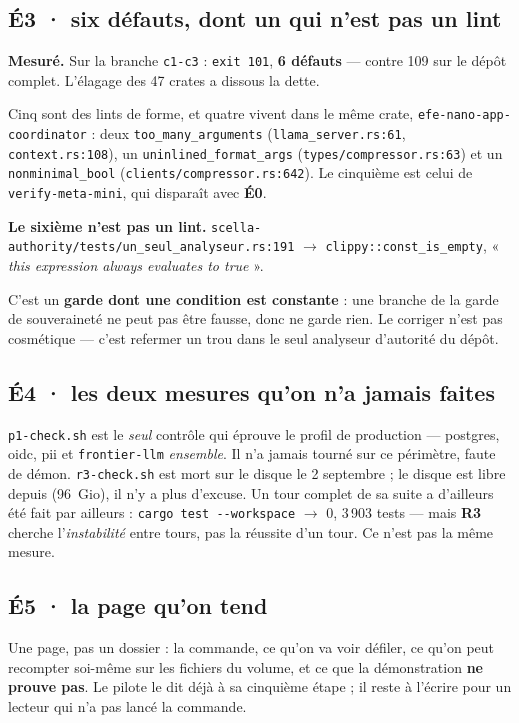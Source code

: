 \documentclass[11pt]{article}
\newcommand{\code}[1]{\texttt{\small #1}}
\newcommand{\mm}[1]{\textbf{#1}}
\newcommand{\mesure}[1]{{\color{efeteal}\textbf{Mesuré.} }#1\par}
\newcommand{\fl}{$\rightarrow$}
\begin{document}
\subsection{\mm{É3} · six défauts, dont un qui n'est pas un lint}
\mesure{Sur la branche \code{c1-c3} : \code{exit 101}, \textbf{6 défauts} --- contre 109 sur le
dépôt complet. L'élagage des 47 crates a dissous la dette.}

Cinq sont des lints de forme, et quatre vivent dans le même crate,
\code{efe-nano-app-coordinator} : deux \code{too\_many\_arguments}
(\code{llama\_server.rs:61}, \code{context.rs:108}), un \code{uninlined\_format\_args}
(\code{types/compressor.rs:63}) et un \code{nonminimal\_bool}
(\code{clients/compressor.rs:642}). Le cinquième est celui de \code{verify-meta-mini}, qui
disparaît avec \mm{É0}.

\begin{cadre}
\textbf{Le sixième n'est pas un lint.}
\code{scella-authority/tests/un\_seul\_analyseur.rs:191} \fl{} \code{clippy::const\_is\_empty},
« \emph{this expression always evaluates to true} ».

C'est un \textbf{garde dont une condition est constante} : une branche de la garde de souveraineté
ne peut pas être fausse, donc ne garde rien. Le corriger n'est pas cosmétique --- c'est refermer
un trou dans le seul analyseur d'autorité du dépôt.
\end{cadre}

\subsection{\mm{É4} · les deux mesures qu'on n'a jamais faites}
\code{p1-check.sh} est le \emph{seul} contrôle qui éprouve le profil de production --- postgres,
oidc, pii et \code{frontier-llm} \emph{ensemble}. Il n'a jamais tourné sur ce périmètre, faute de
démon. \code{r3-check.sh} est mort sur le disque le 2 septembre ; le disque est libre depuis (96~Gio),
il n'y a plus d'excuse. Un tour complet de sa suite a d'ailleurs été fait par ailleurs :
\code{cargo test -{}-workspace} \fl{} 0, 3\,903 tests --- mais \mm{R3} cherche l'\emph{instabilité}
entre tours, pas la réussite d'un tour. Ce n'est pas la même mesure.

\subsection{\mm{É5} · la page qu'on tend}
Une page, pas un dossier : la commande, ce qu'on va voir défiler, ce qu'on peut recompter
soi-même sur les fichiers du volume, et ce que la démonstration \textbf{ne prouve pas}. Le pilote
le dit déjà à sa cinquième étape ; il reste à l'écrire pour un lecteur qui n'a pas lancé la
commande.
\end{document}
